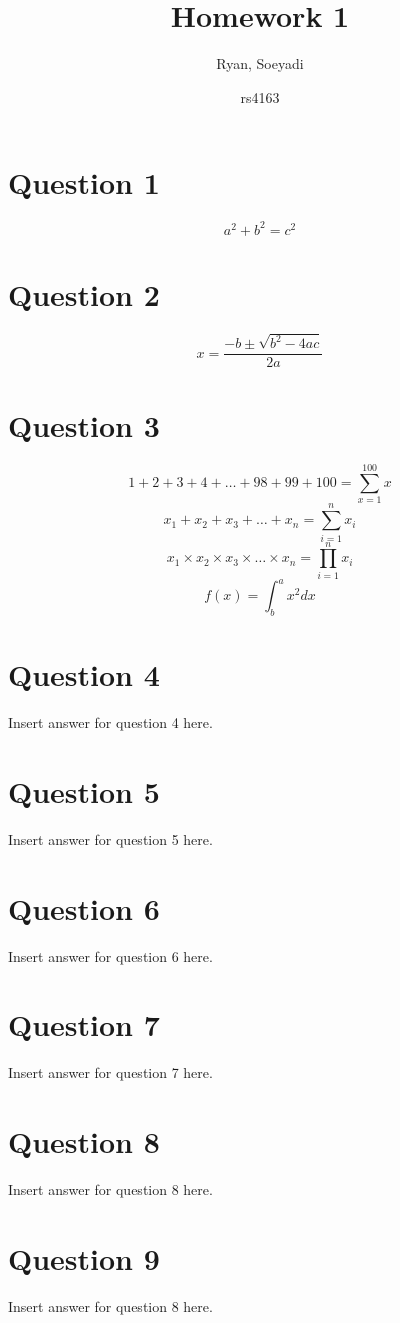 \documentclass{article}
\title{Homework 1}
\author
{
Ryan, Soeyadi
\and rs4163
}
\begin{document}
    \maketitle
    
    \section*{Question 1}
    \[a^2+b^2=c^2\]
    \section*{Question 2}
    \[x= \frac{-b \pm \sqrt{b^2 - 4ac}}{2a}\]
    \section*{Question 3}
    \[1 + 2 + 3 + 4 + \dots + 98 + 99 + 100 = \sum_{x=1}^{100}{x}\]
    \[x_1 + x_2 + x_3 + \dots + x_n = \sum_{i=1}^{n}{x_i}\]
    \[x_1 \times x_2 \times x_3 \times\dots\times x_n = \prod_{i=1}^{n}{x_i}\]
    \[f(x) = \int^a_b x^2dx\]
    \section*{Question 4}
    Insert answer for question 4 here.
    \section*{Question 5}
    Insert answer for question 5 here.
    \section*{Question 6}
    Insert answer for question 6 here.
    \section*{Question 7}
    Insert answer for question 7 here.
    \section*{Question 8}
    Insert answer for question 8 here.
    \section*{Question 9}
    Insert answer for question 8 here.
       
\end{document}

